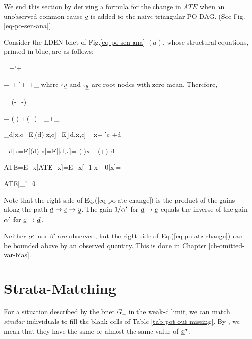 We end this section by
deriving a formula
for the change in $ATE$
when an unobserved
common cause $\rvc$ is added to the
naive triangular PO DAG.
(See Fig.\ref{eq-po-sen-ana})


Consider the LDEN bnet of Fig.\ref{eq-po-sen-ana} $(a)$,
whose structural equations,
printed in blue, are as follows:


\beq\color{blue}
\rvd=\alp\rvx +\alp'\rvc + \eps_\rvd
\eeq

\beq\color{blue}
\rvy = \beta \rvx + \beta'\rvc + \delta \rvd
+\eps_\rvy
\eeq
where $\eps_\rvd$ and $\eps_\rvy$
are root nodes with zero mean.
Therefore,

\beq
\rvc = (\rvd-\eps_\rvd -\alp\rvx)
\eeq

\beq
\rvy = \left(\beta-\;\right)\rvx
+\left(\delta+\right)
\rvd-
\eps_\rvd +\eps_\rvy
\eeq


\beq
\caly_{d|x,c}=E[\rvy(d)|x,c]=E[\rvy|d,x,c]
=\beta x+ \beta'c +\delta d
\eeq

\beq
\caly_{d|x}=E[\rvy(d)|x]=E[\rvy|d,x]=
\left(\beta-\;\right)x
+\left(\delta+\right)
d
\eeq



\beq
ATE=E_x[ATE_x]=E_x[\caly_{1|x}-\caly_{0|x}]=
\delta+
\eeq

\beq
ATE|_{\beta'=0}=\delta
\eeq

\beq
{}
\label{eq-po-ate-change}
\eeq
Note that the right side
of Eq.(\ref{eq-po-ate-change})
is the product of the gains
along the path $\rvd\rarrow \rvc\rarrow\rvy$.
The gain
$1/\alpha'$ for $\rvd\rarrow\rvc$
equals
the inverse of the gain
$\alpha'$ for $\rvc\rarrow\rvd$.

Neither $\alpha'$ nor $\beta'$
are observed, but the right side
of Eq.(\ref{eq-po-ate-change})
can be bounded above by
an observed quantity.
This is done in Chapter \ref{ch-omitted-var-bias}.




\section{Strata-Matching}
\label{sec-strata-matching}

For a situation
described by
the bnet $G_{+}$
\ul{ in the weak-d limit},
we can match {\it similar}
individuals to fill the blank cells of
 Table \ref{tab-pot-out-missing}.
By , we mean that
they have the same or almost the same
value of $\rvx^\s$.

